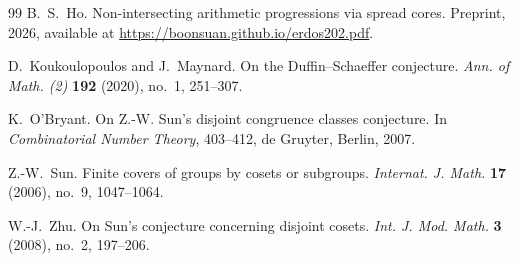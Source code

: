 \documentclass[11pt]{amsart}
\theoremstyle{remark}
\begin{document}
\begin{thebibliography}{99}
B.~S.~Ho.
\newblock Non-intersecting arithmetic progressions via spread cores.
\newblock Preprint, 2026, available at
\url{https://boonsuan.github.io/erdos202.pdf}.

D.~Koukoulopoulos and J.~Maynard.
\newblock On the Duffin--Schaeffer conjecture.
\newblock \emph{Ann. of Math. (2)} \textbf{192} (2020), no.~1, 251--307.

K.~O'Bryant.
\newblock On Z.-W. Sun's disjoint congruence classes conjecture.
\newblock In \emph{Combinatorial Number Theory}, 403--412, de Gruyter,
Berlin, 2007.

Z.-W.~Sun.
\newblock Finite covers of groups by cosets or subgroups.
\newblock \emph{Internat. J. Math.} \textbf{17} (2006), no.~9, 1047--1064.

W.-J.~Zhu.
\newblock On Sun's conjecture concerning disjoint cosets.
\newblock \emph{Int. J. Mod. Math.} \textbf{3} (2008), no.~2, 197--206.

\end{thebibliography}
\end{document}
